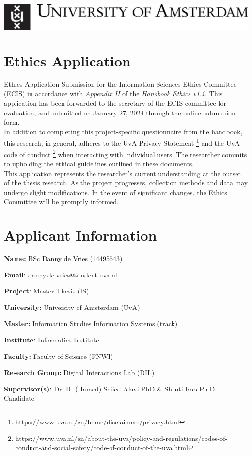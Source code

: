 \documentclass[a4paper]{article}
\begin{document}
\includegraphics[scale=0.2]{uva-logo.jpg} \\

\section*{Ethics Application}

Ethics Application Submission for the Information Sciences Ethics Committee (ECIS) in accordance with \emph{Appendix II} of the \emph{Handbook Ethics v1.2}. This application has been forwarded to the secretary of the ECIS committee for evaluation, and submitted on January 27, 2024 through the online submission form. \\

In addition to completing this project-specific questionnaire from the handbook, this research, in general, adheres to the UvA Privacy Statement \footnote{https://www.uva.nl/en/home/disclaimers/privacy.html} and the UvA code of conduct \footnote{https://www.uva.nl/en/about-the-uva/policy-and-regulations/codes-of-conduct-and-social-safety/code-of-conduct-of-the-uva.html} when interacting with individual users. The researcher commits to upholding the ethical guidelines outlined in these documents. \\

This application represents the researcher's current understanding at the outset of the thesis research. As the project progresses, collection methods and data may undergo slight modifications. In the event of significant changes, the Ethics Committee will be promptly informed.


\section*{Applicant Information}

\begin{description}
  \item \textbf{Name:} BSc Danny de Vries (14495643)
  \item \textbf{Email:} danny.de.vries@student.uva.nl
  \item \textbf{Project:} Master Thesis (IS)
  \item \textbf{University:} University of Amsterdam (UvA)
  \item \textbf{Master:} Information Studies Information Systems (track)
  \item \textbf{Institute:} Informatics Institute
  \item \textbf{Faculty:} Faculty of Science (FNWI)
  \item \textbf{Research Group:} Digital Interactions Lab (DIL)
  \item \textbf{Supervisor(s):} Dr. H. (Hamed) Seiied Alavi PhD \& Shruti Rao Ph.D. Candidate
\end{description}
\end{document}
